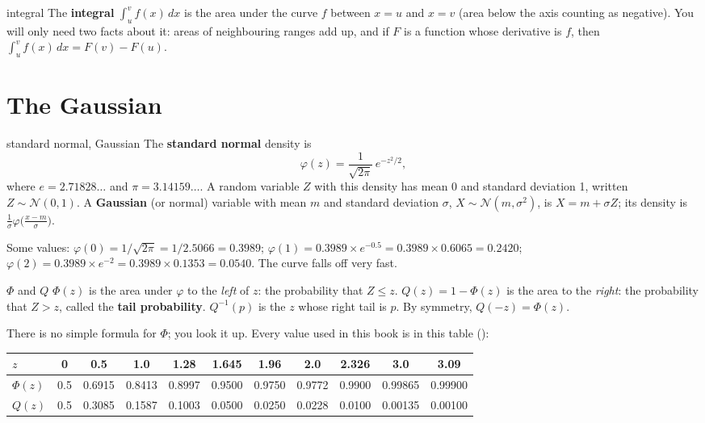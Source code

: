 \documentclass[11pt,a4paper,oneside,openany]{book}
\begin{document}
\begin{defn}{integral}
The \textbf{integral} $\int_{u}^{v} f(x)\,dx$ is the area under the curve $f$ between $x=u$ and $x=v$ (area below the axis
counting as negative). You will only need two facts about it: areas of neighbouring ranges add up, and if $F$ is a function
whose derivative is $f$, then $\int_u^v f(x)\,dx=F(v)-F(u)$.
\end{defn}

\section{The Gaussian}

\begin{defn}{standard normal, Gaussian}
The \textbf{standard normal} density is
\[
  \varphi(z)=\frac{1}{\sqrt{2\pi}}\,e^{-z^2/2},
\]
where $e=2.71828\ldots$ and $\pi=3.14159\ldots$. A random variable $Z$ with this density has mean 0 and standard deviation 1,
written $Z\sim\mathcal N(0,1)$. A \textbf{Gaussian} (or normal) variable with mean $m$ and standard deviation $\sigma$,
$X\sim\mathcal N(m,\sigma^2)$, is $X=m+\sigma Z$; its density is $\frac1\sigma\varphi\big(\frac{x-m}{\sigma}\big)$.
\end{defn}

Some values: $\varphi(0)=1/\sqrt{2\pi}=1/2.5066=0.3989$; $\varphi(1)=0.3989\times e^{-0.5}=0.3989\times0.6065=0.2420$;
$\varphi(2)=0.3989\times e^{-2}=0.3989\times0.1353=0.0540$. The curve falls off very fast.

\begin{defn}{$\Phi$ and $Q$}
$\Phi(z)$ is the area under $\varphi$ to the \emph{left} of $z$: the probability that $Z\le z$. $Q(z)=1-\Phi(z)$ is the area to
the \emph{right}: the probability that $Z>z$, called the \textbf{tail probability}. $Q^{-1}(p)$ is the $z$ whose right tail is
$p$. By symmetry, $Q(-z)=\Phi(z)$.
\end{defn}

There is no simple formula for $\Phi$; you look it up. Every value used in this book is in this table
():

\begin{center}
\begin{tabular}{@{}lcccccccccc@{}}
\toprule
$z$ & 0 & 0.5 & 1.0 & 1.28 & 1.645 & 1.96 & 2.0 & 2.326 & 3.0 & 3.09\\
\midrule
$\Phi(z)$ & 0.5 & 0.6915 & 0.8413 & 0.8997 & 0.9500 & 0.9750 & 0.9772 & 0.9900 & 0.99865 & 0.99900\\
$Q(z)$ & 0.5 & 0.3085 & 0.1587 & 0.1003 & 0.0500 & 0.0250 & 0.0228 & 0.0100 & 0.00135 & 0.00100\\
\bottomrule
\end{tabular}
\end{center}
\end{document}
